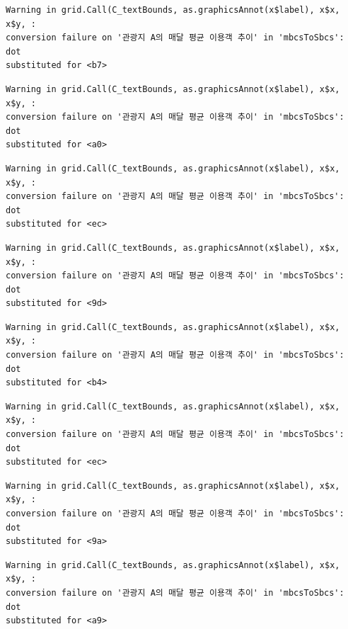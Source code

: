 \documentclass[
  letterpaper,
  DIV=11,
  numbers=noendperiod]{scrreprt}
\begin{document}
\begin{verbatim}
Warning in grid.Call(C_textBounds, as.graphicsAnnot(x$label), x$x, x$y, :
conversion failure on '관광지 A의 매달 평균 이용객 추이' in 'mbcsToSbcs': dot
substituted for <b7>
\end{verbatim}

\begin{verbatim}
Warning in grid.Call(C_textBounds, as.graphicsAnnot(x$label), x$x, x$y, :
conversion failure on '관광지 A의 매달 평균 이용객 추이' in 'mbcsToSbcs': dot
substituted for <a0>
\end{verbatim}

\begin{verbatim}
Warning in grid.Call(C_textBounds, as.graphicsAnnot(x$label), x$x, x$y, :
conversion failure on '관광지 A의 매달 평균 이용객 추이' in 'mbcsToSbcs': dot
substituted for <ec>
\end{verbatim}

\begin{verbatim}
Warning in grid.Call(C_textBounds, as.graphicsAnnot(x$label), x$x, x$y, :
conversion failure on '관광지 A의 매달 평균 이용객 추이' in 'mbcsToSbcs': dot
substituted for <9d>
\end{verbatim}

\begin{verbatim}
Warning in grid.Call(C_textBounds, as.graphicsAnnot(x$label), x$x, x$y, :
conversion failure on '관광지 A의 매달 평균 이용객 추이' in 'mbcsToSbcs': dot
substituted for <b4>
\end{verbatim}

\begin{verbatim}
Warning in grid.Call(C_textBounds, as.graphicsAnnot(x$label), x$x, x$y, :
conversion failure on '관광지 A의 매달 평균 이용객 추이' in 'mbcsToSbcs': dot
substituted for <ec>
\end{verbatim}

\begin{verbatim}
Warning in grid.Call(C_textBounds, as.graphicsAnnot(x$label), x$x, x$y, :
conversion failure on '관광지 A의 매달 평균 이용객 추이' in 'mbcsToSbcs': dot
substituted for <9a>
\end{verbatim}

\begin{verbatim}
Warning in grid.Call(C_textBounds, as.graphicsAnnot(x$label), x$x, x$y, :
conversion failure on '관광지 A의 매달 평균 이용객 추이' in 'mbcsToSbcs': dot
substituted for <a9>
\end{verbatim}
\end{document}

